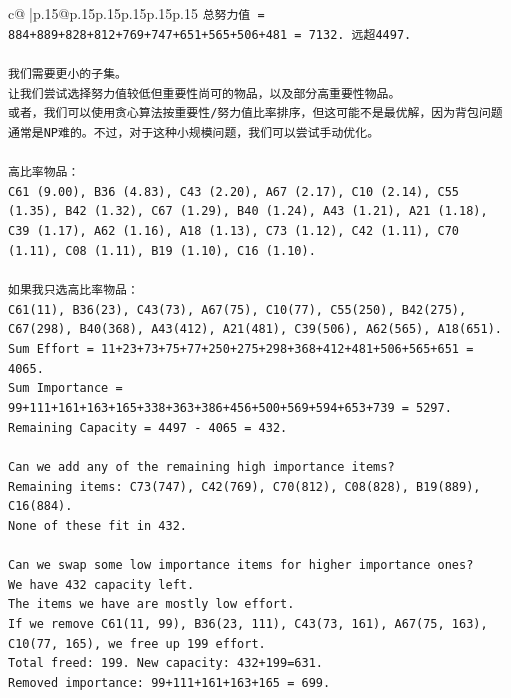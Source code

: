 \documentclass{article}
\begin{document}
{\begin{supertabular}{c@{$\;$}|p{.15\linewidth}@{}p{.15\linewidth}p{.15\linewidth}p{.15\linewidth}p{.15\linewidth}p{.15\linewidth}}
{{{\texttt{总努力值 = 884+889+828+812+769+747+651+565+506+481 = 7132. 远超4497.} \\
\\ 
\texttt{我们需要更小的子集。} \\
\texttt{让我们尝试选择努力值较低但重要性尚可的物品，以及部分高重要性物品。} \\
\texttt{或者，我们可以使用贪心算法按重要性/努力值比率排序，但这可能不是最优解，因为背包问题通常是NP难的。不过，对于这种小规模问题，我们可以尝试手动优化。} \\
\\ 
\texttt{高比率物品：} \\
\texttt{C61 (9.00), B36 (4.83), C43 (2.20), A67 (2.17), C10 (2.14), C55 (1.35), B42 (1.32), C67 (1.29), B40 (1.24), A43 (1.21), A21 (1.18), C39 (1.17), A62 (1.16), A18 (1.13), C73 (1.12), C42 (1.11), C70 (1.11), C08 (1.11), B19 (1.10), C16 (1.10).} \\
\\ 
\texttt{如果我只选高比率物品：} \\
\texttt{C61(11), B36(23), C43(73), A67(75), C10(77), C55(250), B42(275), C67(298), B40(368), A43(412), A21(481), C39(506), A62(565), A18(651).} \\
\texttt{Sum Effort = 11+23+73+75+77+250+275+298+368+412+481+506+565+651 = 4065.} \\
\texttt{Sum Importance = 99+111+161+163+165+338+363+386+456+500+569+594+653+739 = 5297.} \\
\texttt{Remaining Capacity = 4497 {-} 4065 = 432.} \\
\\ 
\texttt{Can we add any of the remaining high importance items?} \\
\texttt{Remaining items: C73(747), C42(769), C70(812), C08(828), B19(889), C16(884).} \\
\texttt{None of these fit in 432.} \\
\\ 
\texttt{Can we swap some low importance items for higher importance ones?} \\
\texttt{We have 432 capacity left.} \\
\texttt{The items we have are mostly low effort.} \\
\texttt{If we remove C61(11, 99), B36(23, 111), C43(73, 161), A67(75, 163), C10(77, 165), we free up 199 effort.} \\
\texttt{Total freed: 199. New capacity: 432+199=631.} \\
\texttt{Removed importance: 99+111+161+163+165 = 699.} \\
}}}
\end{supertabular}}
\end{document}
